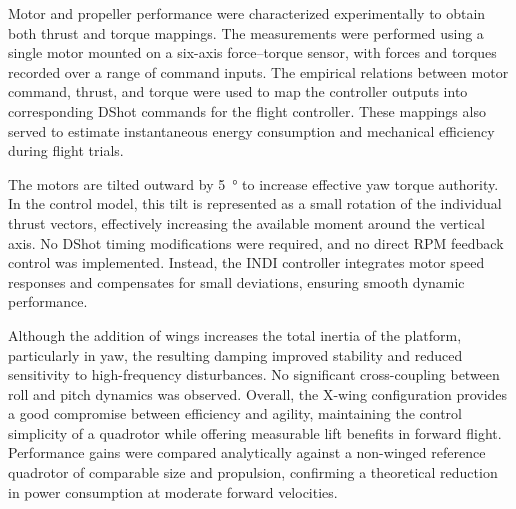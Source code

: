 Motor and propeller performance were characterized experimentally to obtain both thrust and torque mappings.  
The measurements were performed using a single motor mounted on a six-axis force–torque sensor, with forces and torques recorded over a range of command inputs.  
The empirical relations between motor command, thrust, and torque were used to map the controller outputs into corresponding DShot commands for the flight controller.  
These mappings also served to estimate instantaneous energy consumption and mechanical efficiency during flight trials.

The motors are tilted outward by \SI{5}{\degree} to increase effective yaw torque authority.  
In the control model, this tilt is represented as a small rotation of the individual thrust vectors, effectively increasing the available moment around the vertical axis.  
No DShot timing modifications were required, and no direct RPM feedback control was implemented.  
Instead, the INDI controller integrates motor speed responses and compensates for small deviations, ensuring smooth dynamic performance.

Although the addition of wings increases the total inertia of the platform, particularly in yaw, the resulting damping improved stability and reduced sensitivity to high-frequency disturbances.  
No significant cross-coupling between roll and pitch dynamics was observed.  
Overall, the X-wing configuration provides a good compromise between efficiency and agility, maintaining the control simplicity of a quadrotor while offering measurable lift benefits in forward flight.  
Performance gains were compared analytically against a non-winged reference quadrotor of comparable size and propulsion, confirming a theoretical reduction in power consumption at moderate forward velocities.

